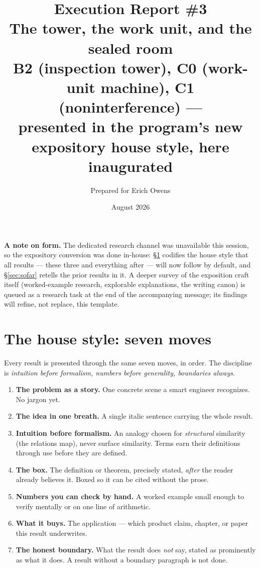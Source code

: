 \documentclass[11pt,a4paper]{article}
\title{\textbf{Execution Report \#3}\\[4pt]
\large The tower, the work unit, and the sealed room\\[3pt]
\normalsize B2 (inspection tower), C0 (work-unit machine), C1 (noninterference) ---\\ presented in the program's new expository house style, here inaugurated}
\author{Prepared for Erich Owens}
\date{August 2026}
\begin{document}
\maketitle

\noindent\textbf{A note on form.} The dedicated research channel was unavailable this session, so the expository conversion was done in-house: \S\ref{sec:style} codifies the house style that all results --- these three and everything after --- will now follow by default, and \S\ref{sec:sofar} retells the prior results in it. A deeper survey of the exposition craft itself (worked-example research, explorable explanations, the writing canon) is queued as a research task at the end of the accompanying message; its findings will refine, not replace, this template.

\section{The house style: seven moves}\label{sec:style}
Every result is presented through the same seven moves, in order. The discipline is \emph{intuition before formalism, numbers before generality, boundaries always}.
\begin{thebox}
\begin{enumerate}[leftmargin=1.6em,itemsep=1pt]
\item \textbf{The problem as a story.} One concrete scene a smart engineer recognizes. No jargon yet.
\item \textbf{The idea in one breath.} A single italic sentence carrying the whole result.
\item \textbf{Intuition before formalism.} An analogy chosen for \emph{structural} similarity (the relations map), never surface similarity. Terms earn their definitions through use before they are defined.
\item \textbf{The box.} The definition or theorem, precisely stated, \emph{after} the reader already believes it. Boxed so it can be cited without the prose.
\item \textbf{Numbers you can check by hand.} A worked example small enough to verify mentally or on one line of arithmetic.
\item \textbf{What it buys.} The application --- which product claim, chapter, or paper this result underwrites.
\item \textbf{The honest boundary.} What the result does \emph{not} say, stated as prominently as what it does. A result without a boundary paragraph is not done.
\end{enumerate}
\end{thebox}
\end{document}
